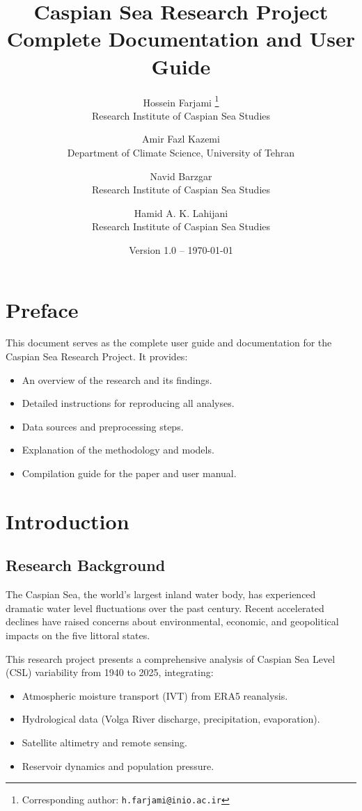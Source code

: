 \documentclass[12pt,a4paper]{article}
\title{\textbf{Caspian Sea Research Project}\\ \Large{Complete Documentation and User Guide}}
\author{
    Hossein Farjami \thanks{Corresponding author: \texttt{h.farjami@inio.ac.ir}} \\
    \small{Research Institute of Caspian Sea Studies}
    \and
    Amir Fazl Kazemi \\
    \small{Department of Climate Science, University of Tehran}
    \and
    Navid Barzgar \\
    \small{Research Institute of Caspian Sea Studies}
    \and
    Hamid A. K. Lahijani \\
    \small{Research Institute of Caspian Sea Studies}
}
\date{Version 1.0 – \today}
\begin{document}
\maketitle
\thispagestyle{empty}

\newpage
\setcounter{page}{1}

\section*{Preface}
This document serves as the complete user guide and documentation for the Caspian Sea Research Project. It provides:
\begin{itemize}
    \item An overview of the research and its findings.
    \item Detailed instructions for reproducing all analyses.
    \item Data sources and preprocessing steps.
    \item Explanation of the methodology and models.
    \item Compilation guide for the paper and user manual.
\end{itemize}

\tableofcontents
\newpage

\section{Introduction}

\subsection{Research Background}
The Caspian Sea, the world's largest inland water body, has experienced dramatic water level fluctuations over the past century. Recent accelerated declines have raised concerns about environmental, economic, and geopolitical impacts on the five littoral states.

This research project presents a comprehensive analysis of Caspian Sea Level (CSL) variability from 1940 to 2025, integrating:
\begin{itemize}
    \item Atmospheric moisture transport (IVT) from ERA5 reanalysis.
    \item Hydrological data (Volga River discharge, precipitation, evaporation).
    \item Satellite altimetry and remote sensing.
    \item Reservoir dynamics and population pressure.
\end{itemize}
\end{document}
